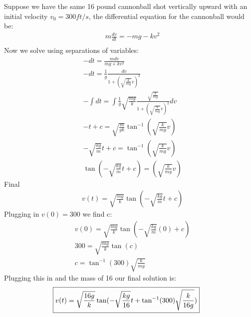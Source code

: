 \documentclass{article}
\begin{document}
\subsubsection{}
Suppose we have the same 16 pound cannonball shot vertically upward with an initial velocity $v_0 = 300 ft/s$, the differential equation for the cannonball would be: 
\setcounter{equation}{0}
\begin{align*}
    & m \frac{dv}{dt} = -mg - kv^2 \\
\end{align*}
Now we solve using separations of variables:
\begin{align}
    & -dt = \frac{mdv}{mg + kv^2} \\
    & -dt = \frac{1}{g} \frac{dv}{1+(\sqrt{\frac{k}{mg}}v)^2} \\
    & -\int dt = \int \frac{1}{g} \sqrt{\frac{mg}{k}} \frac{\sqrt{\frac{k}{mg}}}{1 + (\sqrt{\frac{k}{mg}}v)^2} dv \\
    & -t + c = \sqrt{\frac{m}{gk}} \tan^{-1}(\sqrt{\frac{k}{mg}}v) \\
    & -\sqrt{\frac{kg}{m}}t + c = \tan^{-1}(\sqrt{\frac{k}{mg}}v) \\
    & \tan(-\sqrt{\frac{kg}{m}}t + c) = (\sqrt{\frac{k}{mg}}v)
\end{align}\setcounter{equation}{0}
Final
\begin{align*}
    & v(t) = \sqrt{\frac{mg}{k}} \tan(-\sqrt{\frac{kg}{m}}t + c)
\end{align*}
Plugging in $v(0) = 300$ we find c:
\begin{align}
    & v(0) = \sqrt{\frac{mg}{k}} \tan(-\sqrt{\frac{kg}{m}}(0) + c) \\
    & 300 =  \sqrt{\frac{mg}{k}}\tan(c) \\
    & c = \tan^{-1}(300)\sqrt{\frac{k}{mg}}
\end{align}
Plugging this in and the mass of 16 our final solution is:
\begin{align*}
     \Aboxed{v(t) = \sqrt{\frac{16g}{k}} \tan(-\sqrt{\frac{kg}{16}}t + \tan^{-1}(300)\sqrt{\frac{k}{16g}})}
\end{align*}
\setcounter{section}{4}
\setcounter{subsection}{0}
\subsection{}
\setcounter{subsubsection}{0}
\end{document}
